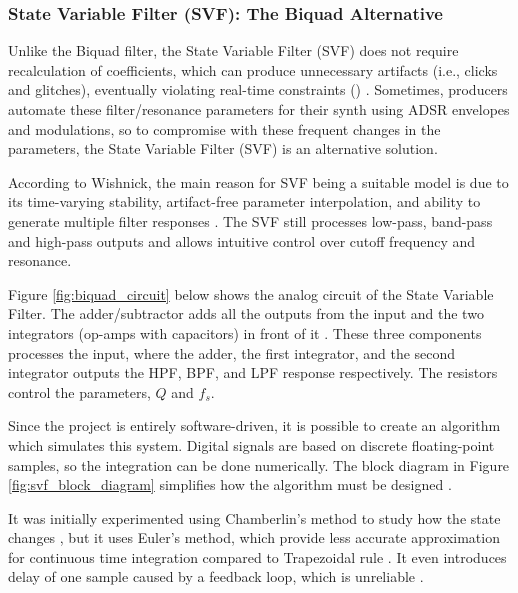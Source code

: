 \subsubsection{State Variable Filter (SVF): The Biquad Alternative}

Unlike the Biquad filter, the State Variable Filter (SVF) does not require recalculation of coefficients, which can
produce unnecessary artifacts (i.e., clicks and glitches), eventually violating real-time constraints () 
\cite{anthropicclaude}. Sometimes, producers automate these filter/resonance parameters for their synth using ADSR envelopes and modulations, 
so to compromise with these frequent changes in the parameters, the State Variable Filter (SVF) is an alternative solution.

According to Wishnick, the main reason for SVF being a suitable model is due to its time-varying stability, 
artifact-free parameter interpolation, and ability to generate multiple filter responses \cite{Wishnick14}.  The SVF 
still processes low-pass, band-pass and high-pass outputs and allows intuitive control over cutoff frequency and 
resonance.

Figure \ref{fig:biquad_circuit} below shows the analog circuit of the State Variable Filter. The adder/subtractor
adds all the outputs from the input and the two integrators (op-amps with capacitors) in front of it \cite{elliott2012statevariable}. 
These three components processes the input, where the adder, the first integrator, and the second integrator 
outputs the HPF, BPF, and LPF response respectively. The resistors control the parameters, $Q$ and $f_s$.



Since the project is entirely software-driven, it is possible to create an algorithm which simulates this system.
Digital signals are based on discrete floating-point samples, so the integration can be done numerically. The 
block diagram in Figure \ref{fig:svf_block_diagram} simplifies how the algorithm must be designed 
\cite{vafilterdesign2021,synthengineer_zdf_filters}.



It was initially experimented using Chamberlin's method to study how the state changes \cite{algorithm_chamberlin_svf},
but it uses Euler's method, which provide less accurate approximation for continuous time integration compared to 
Trapezoidal rule \cite{spiteri_chap3}. It even introduces delay of one sample caused by a feedback loop, which is
unreliable \cite{openai_chatgpt}.


